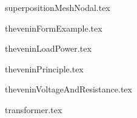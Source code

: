 \begin{frame}{superpositionMeshNodal.tex}
\begin{center}

\end{center}
\end{frame}

\begin{frame}{theveninFormExample.tex}
\begin{center}

\end{center}
\end{frame}

\begin{frame}{theveninLoadPower.tex}
\begin{center}

\end{center}
\end{frame}

\begin{frame}{theveninPrinciple.tex}
\begin{center}

\end{center}
\end{frame}

\begin{frame}{theveninVoltageAndResistance.tex}
\begin{center}

\end{center}
\end{frame}

\begin{frame}{transformer.tex}
\begin{center}

\end{center}
\end{frame}

